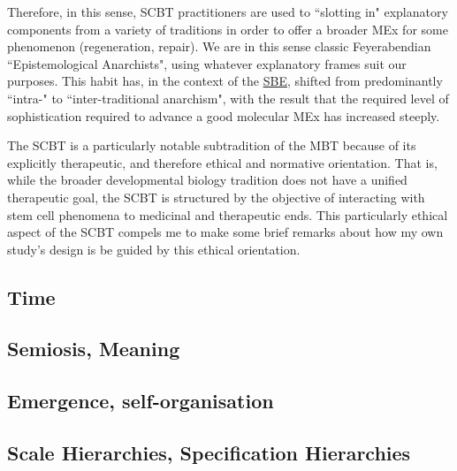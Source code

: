  Therefore, in this sense, SCBT practitioners are used to ``slotting in" explanatory components from a variety of traditions in order to offer a broader MEx for some phenomenon (regeneration, repair). We are in this sense classic Feyerabendian ``Epistemological Anarchists", using whatever explanatory frames suit our purposes. This habit has, in the context of the \hyperref[SBE]{SBE}, shifted from predominantly ``intra-" to ``inter-traditional anarchism", with the result that the required level of sophistication required to advance a good molecular MEx has increased steeply.
 
 The SCBT is a particularly notable subtradition of the MBT because of its explicitly therapeutic, and therefore ethical and normative orientation. That is, while the broader developmental biology tradition does not have a unified therapeutic goal, the SCBT is structured by the objective of interacting with stem cell phenomena to medicinal and therapeutic ends. This particularly ethical aspect of the SCBT compels me to make some brief remarks about how my own study's design is be guided by this ethical orientation.

\subsection{Time}
\label{time}
\subsection{Semiosis, Meaning}
\label{semiosis}
\subsection{Emergence, self-organisation}
\label{emergence}
\subsection{Scale Hierarchies, Specification Hierarchies}
\label{hierarchy}
